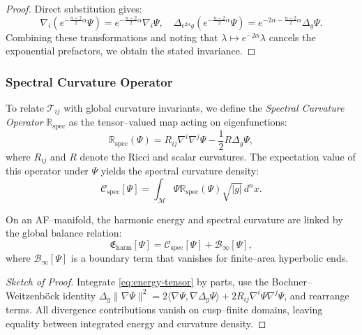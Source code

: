 \begin{proof}
Direct substitution gives:
\[
\nabla_i(e^{-\frac{n-2}{2}\alpha}\Psi)
= e^{-\frac{n-2}{2}\alpha}\nabla_i \Psi,
\quad
\Delta_{e^{2\alpha}g}(e^{-\frac{n-2}{2}\alpha}\Psi)
= e^{-2\alpha-\frac{n-2}{2}\alpha}\Delta_g\Psi.
\]
Combining these transformations
and noting that \(\lambda \mapsto e^{-2\alpha}\lambda\)
cancels the exponential prefactors, we obtain the stated invariance.
\end{proof}


\subsubsection*{Spectral Curvature Operator}

To relate \(\mathcal{T}_{ij}\) with global curvature invariants,
we define the \emph{Spectral Curvature Operator} \(\mathbb{R}_{\mathrm{spec}}\)
as the tensor–valued map acting on eigenfunctions:
\begin{equation}
\mathbb{R}_{\mathrm{spec}}(\Psi)
=
R_{ij}\nabla^i\nabla^j \Psi
- \frac{1}{2} R \Delta_g \Psi,
\end{equation}
where \(R_{ij}\) and \(R\) denote the Ricci and scalar curvatures.
The expectation value of this operator under \(\Psi\) yields
the spectral curvature density:
\begin{equation}
\label{eq:spectral-curvature-density}
\mathcal{C}_{\mathrm{spec}}[\Psi]
=
\int_{\mathcal{M}}
\Psi \mathbb{R}_{\mathrm{spec}}(\Psi)
\sqrt{|g|}\,d^nx.
\end{equation}

\begin{proposition}
\label{prop:spectral-balance}
On an AF–manifold,
the harmonic energy and spectral curvature
are linked by the global balance relation:
\begin{equation}
\label{eq:balance-law}
\mathfrak{E}_{\mathrm{harm}}[\Psi]
=
\mathcal{C}_{\mathrm{spec}}[\Psi]
+
\mathcal{B}_\infty[\Psi],
\end{equation}
where \(\mathcal{B}_\infty[\Psi]\)
is a boundary term that vanishes for finite–area hyperbolic ends.
\end{proposition}

\begin{proof}[Sketch of Proof]
Integrate \eqref{eq:energy-tensor} by parts,
use the Bochner–Weitzenböck identity
\(\Delta_g \|\nabla\Psi\|^2 = 2\langle\nabla\Psi,\nabla\Delta_g\Psi\rangle + 2R_{ij}\nabla^i\Psi\nabla^j\Psi\),
and rearrange terms.
All divergence contributions vanish on cusp–finite domains,
leaving equality between integrated energy and curvature density.
\end{proof}

